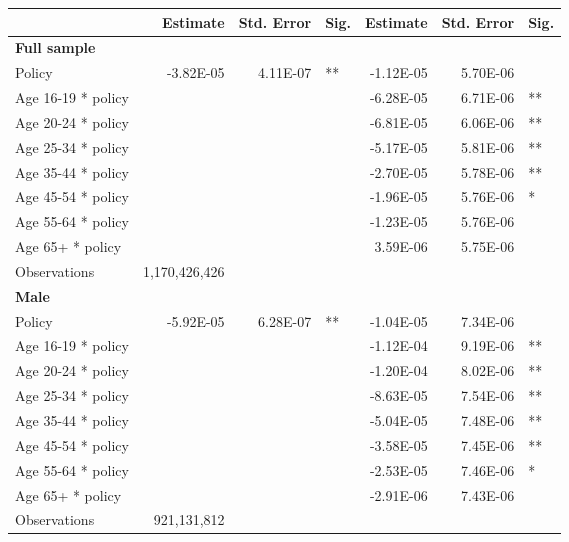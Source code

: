 
\begin{table}%
\centering 
\begin{tabular}{l r r l r r l} 

\hline 
 
 & Estimate & Std. Error & Sig. & Estimate & Std. Error & Sig. \\ 

\hline 
 
\textbf{Full sample} \\ 

Policy             &  -3.82E-05        &  4.11E-07       &   **       &  -1.12E-05        &  5.70E-06       &            \\ 
Age 16-19 * policy           & & &  &  -6.28E-05        &  6.71E-06       &   **       \\ 
Age 20-24 * policy           & & &  &  -6.81E-05        &  6.06E-06       &   **       \\ 
Age 25-34 * policy           & & &  &  -5.17E-05        &  5.81E-06       &   **       \\ 
Age 35-44 * policy           & & &  &  -2.70E-05        &  5.78E-06       &   **       \\ 
Age 45-54 * policy           & & &  &  -1.96E-05        &  5.76E-06       &    *       \\ 
Age 55-64 * policy           & & &  &  -1.23E-05        &  5.76E-06       &            \\ 
Age 65+ * policy           & & &  &  3.59E-06        &  5.75E-06       &            \\ 
Observations & 1,170,426,426 \\ 


\hline 

\textbf{Male} \\ 

Policy             &  -5.92E-05        &  6.28E-07       &   **       &  -1.04E-05        &  7.34E-06       &            \\ 
Age 16-19 * policy           & & &  &  -1.12E-04        &  9.19E-06       &   **       \\ 
Age 20-24 * policy           & & &  &  -1.20E-04        &  8.02E-06       &   **       \\ 
Age 25-34 * policy           & & &  &  -8.63E-05        &  7.54E-06       &   **       \\ 
Age 35-44 * policy           & & &  &  -5.04E-05        &  7.48E-06       &   **       \\ 
Age 45-54 * policy           & & &  &  -3.58E-05        &  7.45E-06       &   **       \\ 
Age 55-64 * policy           & & &  &  -2.53E-05        &  7.46E-06       &    *       \\ 
Age 65+ * policy           & & &  &  -2.91E-06        &  7.43E-06       &            \\ 
Observations & 921,131,812 \\ 



\end{tabular}
\end{table}
